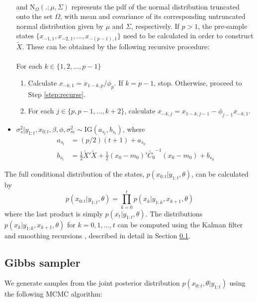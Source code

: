 \documentclass{article}
\begin{document}
\begin{itemize}
\begin{align*}
\end{align*}
\noindent and $\mbox{N}_{\Omega}(.;\mu,\Sigma)$ represents the pdf of the normal distribution truncated onto the set $\Omega$, with mean and covariance of its corresponding untruncated normal distribution given by $\mu$ and $\Sigma$, respectively. If $p > 1$, the pre-sample states $\{x_{-1,1}, x_{-2,1}, \ldots, x_{-(p-1),1}\}$ need to be calculated in order to construct $\tilde{X}$. These can be obtained by the following recursive procedure: \\
\\
For each $k \in \{1,2,\ldots,p-1\}$
\begin{enumerate}
\item Calculate $x_{-k,1} = x_{1-k,p} / \phi_p$. If $k = p - 1$, stop. Otherwise, proceed to Step \ref{step:recurse}.
\item For each $j \in \{p,p-1,\ldots,k+2\}$, calculate $x_{-k,j} = x_{1-k,j-1} - \phi_{j-1}x_{-k,1}$. \label{step:recurse}
\end{enumerate}
\item $\sigma^2_s|y_{1:t},x_{0:t},\beta,\phi,\sigma^2_m \sim \mbox{IG}(a_{s_t}, b_{s_t})$, where
\begin{align*}
a_{s_t} &= (p/2)(t+1) + a_{s_0} \\
b_{s_t} &= \frac{1}{2}\tilde{X}'\tilde{X} + \frac{1}{2}(x_0-m_0)'\tilde{C_0}^{-1}(x_0-m_0) + b_{s_0}
\end{align*}
\end{itemize}

The full conditional distribution of the states, $p(x_{0:t}|y_{1:t},\theta)$, can be calculated by
\[p(x_{0:t}|y_{1:t},\theta) = \prod_{k=0}^t p(x_k|y_{1:k},x_{k+1},\theta)\]
where the last product is simply $p(x_t|y_{1:t},\theta)$. The distributions $p(x_k|y_{1:k},x_{k+1},\theta)$ for $k = 0,1,\ldots,t$ can be computed using the Kalman filter and smoothing recursions \citep{petris2009dynamic}, described in detail in Section \ref{sec:gibbs}.

\subsection{Gibbs sampler} \label{sec:gibbs}

We generate samples from the joint posterior distribution $p(x_{0:t},\theta|y_{1:t})$ using the following MCMC algorithm:
\end{document}
